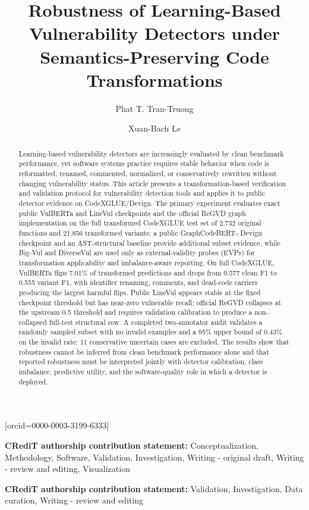 \documentclass[a4paper,fleqn]{cas-dc}
\providecommand{\credit}[1]{%
  \par\smallskip\noindent\textbf{CRediT authorship contribution statement:} #1\par\smallskip
}
\begin{document}
\title[mode=title]{Robustness of Learning-Based Vulnerability Detectors under Semantics-Preserving Code Transformations}

\author[1,2]{Phat T. Tran-Truong}[orcid=0000-0003-3199-6333]
\credit{Conceptualization, Methodology, Software, Validation, Investigation, Writing - original draft, Writing - review and editing, Visualization}
\author[1,2]{Xuan-Bach Le}
\credit{Validation, Investigation, Data curation, Writing - review and editing}

\address[1]{Faculty of Computer Science and Engineering, Ho Chi Minh City University of Technology (HCMUT), 268 Ly Thuong Kiet Street, Dien Hong Ward, Ho Chi Minh City, Vietnam}
\address[2]{Vietnam National University Ho Chi Minh City, Linh Xuan Ward, Ho Chi Minh City, Vietnam}

\begin{abstract}
Learning-based vulnerability detectors are increasingly evaluated by clean
benchmark performance, yet software systems practice requires stable behavior
when code is reformatted, renamed, commented, normalized, or conservatively
rewritten without changing vulnerability status. This article presents a
transformation-based verification and validation protocol for vulnerability
detection tools and applies it to public detector evidence on CodeXGLUE/Devign.
The primary experiment
evaluates exact public VulBERTa and LineVul checkpoints and the official ReGVD
graph implementation on the full transformed CodeXGLUE test set of 2,732
original functions and 21,856 transformed variants; a public GraphCodeBERT-
Devign checkpoint and an AST-structural baseline provide additional subset
evidence, while Big-Vul and DiverseVul are used only as external-validity probes (EVPs)
for transformation applicability and imbalance-aware reporting. On full
CodeXGLUE, VulBERTa flips 7.01\% of transformed predictions and drops from
0.577 clean F1 to 0.555 variant F1, with identifier renaming, comments, and
dead-code carriers producing the largest harmful flips. Public LineVul appears
stable at the fixed checkpoint threshold but has near-zero vulnerable recall;
official ReGVD collapses at the upstream 0.5 threshold and requires validation
calibration to produce a non-collapsed full-test structural row. A completed
two-annotator audit validates a randomly sampled subset with no invalid
examples and a 95\% upper bound of 0.43\% on the invalid rate; 11 conservative
uncertain cases are excluded. The results show that
robustness cannot be inferred from clean benchmark performance alone and that
reported robustness must be interpreted jointly with detector calibration,
class imbalance, predictive utility, and the software-quality role in which a
detector is deployed.
\end{abstract}
\end{document}
